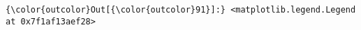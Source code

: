 \documentclass[11pt]{article}
\begin{document}
\begin{Verbatim}[commandchars=\\\{\}]
{\color{outcolor}Out[{\color{outcolor}91}]:} <matplotlib.legend.Legend at 0x7f1af13aef28>
\end{Verbatim}
            
    \begin{center}
    \end{center}
    { \hspace*{\fill} \\}
    

    
    
    
    
\end{document}
